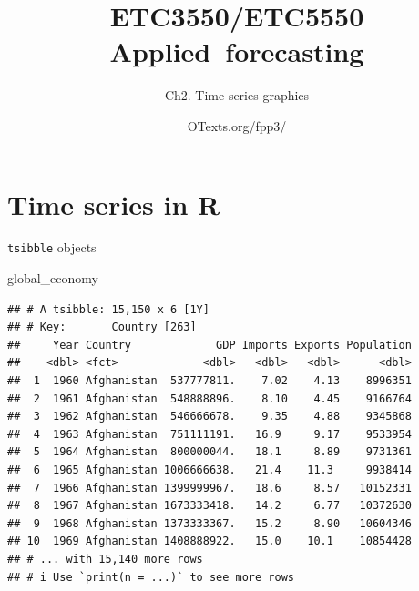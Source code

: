 \documentclass[14pt,ignorenonframetext,aspectratio=169]{beamer}
\title[]{ETC3550/ETC5550 Applied~forecasting}
\author[
        Ch2. Time series graphics
    ]{Ch2. Time series graphics}
\date[
      OTexts.org/fpp3/
  ]{
      OTexts.org/fpp3/
        }
\newenvironment{Shaded}{\begin{snugshade}}{\end{snugshade}}
\newcommand{\NormalTok}[1]{#1}
\renewenvironment{Shaded}{\color{black}\begin{snugshade}\color{black}}{\end{snugshade}}
\renewenvironment{Shaded}{\color{black}\fontsize{10}{10}\sf\begin{snugshade}\color{black}}{\end{snugshade}}
\begin{document}
  \begin{frame}[plain]
  \titlepage
  \end{frame}



\hypertarget{time-series-in-r}{%
\section{Time series in R}\label{time-series-in-r}}

\begin{frame}[fragile]{\texttt{tsibble} objects}
\protect\hypertarget{tsibble-objects}{}
\fontsize{10}{11.2}\sf

\begin{Shaded}
\begin{Highlighting}[]
\NormalTok{global\_economy}
\end{Highlighting}
\end{Shaded}

\begin{verbatim}
## # A tsibble: 15,150 x 6 [1Y]
## # Key:       Country [263]
##     Year Country             GDP Imports Exports Population
##    <dbl> <fct>             <dbl>   <dbl>   <dbl>      <dbl>
##  1  1960 Afghanistan  537777811.    7.02    4.13    8996351
##  2  1961 Afghanistan  548888896.    8.10    4.45    9166764
##  3  1962 Afghanistan  546666678.    9.35    4.88    9345868
##  4  1963 Afghanistan  751111191.   16.9     9.17    9533954
##  5  1964 Afghanistan  800000044.   18.1     8.89    9731361
##  6  1965 Afghanistan 1006666638.   21.4    11.3     9938414
##  7  1966 Afghanistan 1399999967.   18.6     8.57   10152331
##  8  1967 Afghanistan 1673333418.   14.2     6.77   10372630
##  9  1968 Afghanistan 1373333367.   15.2     8.90   10604346
## 10  1969 Afghanistan 1408888922.   15.0    10.1    10854428
## # ... with 15,140 more rows
## # i Use `print(n = ...)` to see more rows
\end{verbatim}

\end{frame}
\end{document}
